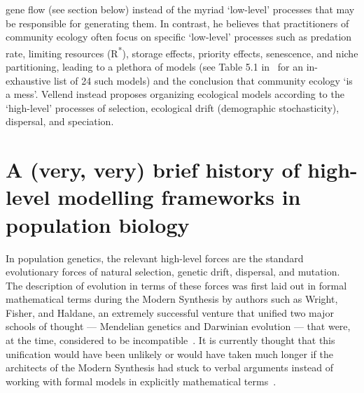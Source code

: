 gene flow (see section below) instead of the myriad `low-level' processes that may be responsible for generating them. In contrast, he believes that practitioners of community ecology often focus on
specific `low-level' processes such as predation rate, limiting resources (R\textsuperscript{*}), storage effects,
priority effects, senescence, and niche partitioning, leading to a plethora of models (see Table
5.1 in~\cite{vellend_theory_2016} for an in-exhaustive list of 24 such models) and the conclusion that
community ecology `is a mess'. Vellend instead proposes organizing ecological models according to
 the `high-level’ processes of selection, ecological drift (demographic stochasticity), dispersal,
and speciation.

\section{A (very, very) brief history of high-level modelling frameworks in population biology}\label{sec_history}

In population genetics, the relevant high-level forces are the standard evolutionary forces of natural selection, genetic drift, dispersal, and mutation. The description of evolution in terms of these forces was first laid out in formal mathematical terms during the Modern Synthesis by authors such as Wright, Fisher, and Haldane, an extremely successful venture that unified two major schools of thought --- Mendelian genetics and Darwinian evolution --- that were, at the time, considered to be incompatible~\citep{provine_origins_2001}. It is currently thought that this unification would have been unlikely or would have taken much longer if the architects of the Modern Synthesis had stuck to verbal arguments instead of working with formal models in explicitly mathematical terms~\citep{walsh_darwins_2014}. 

